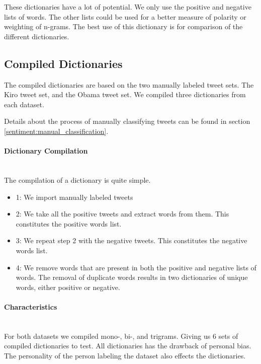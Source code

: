 These dictionaries have a lot of potential. We only use the
positive and negative lists of words. The other lists could be used for a
better measure of polarity or weighting of n-grams. The best use of this
dictionary is for comparison of the different dictionaries.  
%

\subsection{Compiled Dictionaries}\label{data:compiled_dictionaries}
The compiled dictionaries are based on the two manually labeled tweet sets. The
Kiro tweet set, and the Obama tweet set. We compiled three dictionaries from
each dataset. 

Details about the process of manually classifying tweets can be found in section
\ref{sentiment:manual_classification}.

\paragraph{Dictionary Compilation}
\hspace{0pt}\\
The compilation of a dictionary is quite simple. 
\begin{itemize}
    \item 1: We import manually labeled tweets
    \item 2: We take all the positive tweets and extract words from them. This
constitutes the positive words list. 
    \item 3: We repeat step 2 with the negative tweets. This constitutes the
negative words list. 
    \item 4: We remove words that are present in both the positive and negative
lists of words. The removal of duplicate words results in two dictionaries of
unique words, either positive or negative.  
\end{itemize}

\paragraph{Characteristics}
\hspace{0pt}\\
For both datasets we compiled mono-, bi-, and trigrams. Giving us 6 sets of
compiled dictionaries to test. All dictionaries has the drawback of personal
bias. The personality of the person labeling the dataset also effects the
dictionaries. 
%

